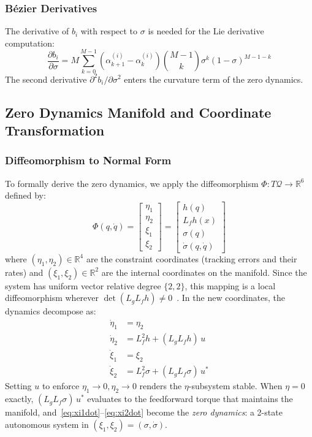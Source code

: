 \documentclass[conference]{IEEEtran}
\begin{document}
\subsubsection{B\'ezier Derivatives}
The derivative of $b_i$ with respect to $\sigma$ is needed for the Lie derivative computation:
\begin{equation}
    \frac{\partial b_i}{\partial \sigma} = M \sum_{k=0}^{M-1} (\alpha_{k+1}^{(i)} - \alpha_k^{(i)}) \binom{M-1}{k} \sigma^k (1-\sigma)^{M-1-k}
\end{equation}
The second derivative $\partial^2 b_i/\partial \sigma^2$ enters the curvature term of the zero dynamics.

\subsection{Zero Dynamics Manifold and Coordinate Transformation}

\subsubsection{Diffeomorphism to Normal Form}
To formally derive the zero dynamics, we apply the diffeomorphism $\Phi: T\mathcal{Q} \to \mathbb{R}^6$ defined by:
\begin{equation}
    \Phi(q,\dot{q}) = \begin{bmatrix} \eta_1 \\ \eta_2 \\ \xi_1 \\ \xi_2 \end{bmatrix}
    = \begin{bmatrix} h(q) \\ L_f h(x) \\ \sigma(q) \\ \dot{\sigma}(q,\dot{q}) \end{bmatrix}
    \label{eq:diffeo}
\end{equation}
where $(\eta_1, \eta_2) \in \mathbb{R}^4$ are the constraint coordinates (tracking errors and their rates) and $(\xi_1, \xi_2) \in \mathbb{R}^2$ are the internal coordinates on the manifold. Since the system has uniform vector relative degree $\{2,2\}$, this mapping is a local diffeomorphism wherever $\det(L_g L_f h) \neq 0$~\cite{westervelt}. In the new coordinates, the dynamics decompose as:
\begin{align}
    \dot{\eta}_1 &= \eta_2 \\
    \dot{\eta}_2 &= L_f^2 h + (L_g L_f h)\,u \\
    \dot{\xi}_1  &= \xi_2 \label{eq:xi1dot}\\
    \dot{\xi}_2  &= L_f^2 \sigma + (L_g L_f \sigma)\,u^* \label{eq:xi2dot}
\end{align}
Setting $u$ to enforce $\eta_1 \to 0, \eta_2 \to 0$ renders the $\eta$-subsystem stable. When $\eta = 0$ exactly, $(L_g L_f \sigma)\,u^*$ evaluates to the feedforward torque that maintains the manifold, and~\eqref{eq:xi1dot}--\eqref{eq:xi2dot} become the \emph{zero dynamics}: a 2-state autonomous system in $(\xi_1, \xi_2) = (\sigma, \dot{\sigma})$.
\end{document}
